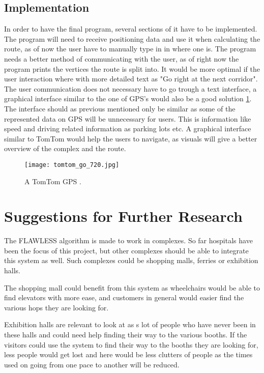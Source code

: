 \subsection{Implementation}

In order to have the final program, several sections of it have to be implemented. The program will need to receive positioning data and use it when calculating the route, as of now the user have to manually type in in where one is. The program needs a better method of communicating with the user, as of right now the program prints the vertices the route is split into. It would be more optimal if the user interaction where with more detailed text as "Go right at the next corridor". The user communication does not necessary have to go trough a text interface, a graphical interface similar to the one of GPS's would also be a good solution \cref{fig:TomTom}. The interface should as previous mentioned only be similar as some of the represented data on GPS will be unnecessary for users. This is information like speed and driving related information as parking lots etc. A graphical interface similar to TomTom would help the users to navigate, as visuals will give a better overview of the complex and the route. 

\begin{figure}
\centering
    \texttt{[image: tomtom\_go\_720.jpg]}
    \caption{A TomTom GPS \cite{diss_tomtom}.} \label{fig:TomTom}
\end{figure}


\section{Suggestions for Further Research}

The FLAWLESS algorithm is made to work in complexes. So far hospitals have been the focus of this project, but other complexes should be able to integrate this system as well. Such complexes could be shopping malls, ferries or exhibition halls. 

The shopping mall could benefit from this system as wheelchairs would be able to find elevators with more ease, and customers in general would easier find the various hops they are looking for. 

Exhibition halls are relevant to look at as s lot of people who have never been in these halls and could need help finding their way to the various booths. If the visitors could use the system to find their way to the booths they are looking for, less people would get lost and here would be less clutters of people as the times used on going from one pace to another will be reduced. 
\newline 


